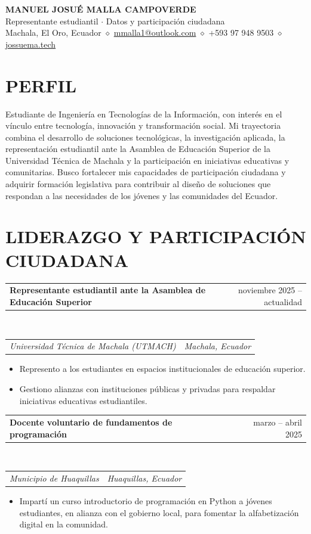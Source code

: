 \documentclass[letterpaper,10pt]{article}
\makeatletter
\newcommand{\fila}[2]{%
  \begin{tabular*}{\textwidth}{@{}l@{\extracolsep{\fill}}r@{}}
    #1 & #2 \\
  \end{tabular*}%
}
\newcommand{\entrada}[4]{%
  \fila{\textbf{#1}}{#2}\\[1pt]
  \fila{\textit{#3}}{\textit{#4}}\vspace{1pt}%
}
\newenvironment{vinetas}
  {\begin{itemize}[leftmargin=1.4em,label=$\bullet$,itemsep=0.5pt,topsep=1pt,parsep=0pt,partopsep=0pt]}
  {\end{itemize}\vspace{1pt}}
\makeatother
\begin{document}
\begin{center}
  {\LARGE \textbf{MANUEL JOSUÉ MALLA CAMPOVERDE}}\\[2pt]
  {\small Representante estudiantil $\cdot$ Datos y participación ciudadana}\\[2pt]
  Machala, El Oro, Ecuador $\diamond$ \href{mailto:mmalla1@outlook.com}{mmalla1@outlook.com}
  $\diamond$ +593 97 948 9503 $\diamond$ \href{https://jossuema.tech}{jossuema.tech}
\end{center}
\vspace{-4pt}

\section*{PERFIL}

Estudiante de Ingeniería en Tecnologías de la Información, con interés en el
vínculo entre tecnología, innovación y transformación social. Mi trayectoria
combina el desarrollo de soluciones tecnológicas, la investigación aplicada,
la representación estudiantil ante la Asamblea de Educación Superior de la
Universidad Técnica de Machala y la participación en iniciativas educativas y
comunitarias. Busco fortalecer mis capacidades de participación ciudadana y
adquirir formación legislativa para contribuir al diseño de soluciones que
respondan a las necesidades de los jóvenes y las comunidades del Ecuador.

\section*{LIDERAZGO Y PARTICIPACIÓN CIUDADANA}

\entrada{Representante estudiantil ante la Asamblea de Educación Superior}{noviembre 2025 -- actualidad}
        {Universidad Técnica de Machala (UTMACH)}{Machala, Ecuador}
\begin{vinetas}
  \item Represento a los estudiantes en espacios institucionales de educación
        superior.
  \item Gestiono alianzas con instituciones públicas y privadas para
        respaldar iniciativas educativas estudiantiles.
\end{vinetas}

\entrada{Docente voluntario de fundamentos de programación}{marzo -- abril 2025}
        {Municipio de Huaquillas}{Huaquillas, Ecuador}
\begin{vinetas}
  \item Impartí un curso introductorio de programación en Python a jóvenes
        estudiantes, en alianza con el gobierno local, para fomentar la
        alfabetización digital en la comunidad.
\end{vinetas}
\end{document}
